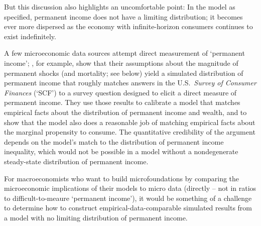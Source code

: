 \documentclass[BufferStockTheory]{subfiles}
\begin{document}
But this discussion also highlights an uncomfortable point: In the model as specified, permanent income does not have a limiting distribution; it becomes ever more dispersed as the economy with infinite-horizon consumers continues to exist indefinitely.

A few microeconomic data sources attempt direct measurement of `permanent income'; \cite{cstwMPC}, for example, show that their assumptions about the magnitude of permanent shocks (and mortality; see below) yield a simulated distribution of permanent income that roughly matches answers in the U.S.\ \emph{Survey of Consumer Finances} (`SCF') to a survey question designed to elicit a direct measure of permanent income.  They use those results to calibrate a model that matches empirical facts about the distribution of permanent income and wealth, and to show that the model also does a reasonable job of matching empirical facts about the marginal propensity to consume.  The quantitative credibility of the argument depends on the model's match to the distribution of permanent income inequality, which would not be possible in a model without a nondegenerate steady-state distribution of permanent income.

For macroeconomists who want to build microfoundations by comparing the microeconomic implications of their models to micro data (directly -- not in ratios to difficult-to-meaure `permanent income'), it would be something of a challenge to determine how to construct empirical-data-comparable simulated results from a model with no limiting distribution of permanent income.

\begin{comment}
  \hypertarget{Consumption-and-Income-Growth-at-the-Household-Level}{}
  \subsection{Identical Growth in Income, Consumption, and Wealth}\label{subsec:cGroEqPermGroFacIndQ}

  Unfortunately, the {\GICMod} condition that we imposed which yielded all of these intuitive propositions at once is rather restrictive.  Modeling experience indicates that it is not always possible to find plausible combinations of parameter values that satisfy that condition.  Furthermore, while the {\GICRaw} is a considerably looser condition, as noted above (and as

\end{comment}
\end{document}
